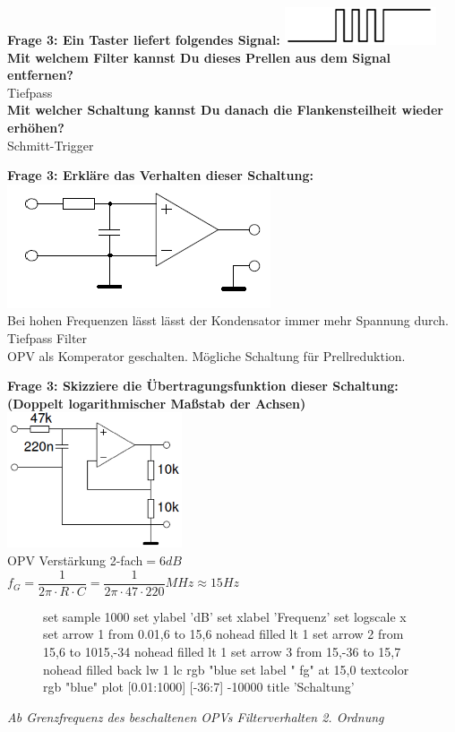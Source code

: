 \documentclass[11pt,a4paper]{scrartcl}
\begin{document}
\textbf{Frage 3: Ein Taster liefert folgendes Signal:} \includegraphics{Taster.png}\\
\textbf{Mit welchem Filter kannst Du dieses Prellen aus dem Signal entfernen?}\\
Tiefpass\\
\textbf{Mit welcher Schaltung kannst Du danach die Flankensteilheit wieder erhöhen?}\\
Schmitt-Trigger

\textbf{Frage 3: Erkläre das Verhalten dieser Schaltung:}\\
\includegraphics{Schaltung_1.png}\\
Bei hohen Frequenzen lässt lässt der Kondensator immer mehr Spannung durch. Tiefpass Filter\\
OPV als Komperator geschalten. Mögliche Schaltung für Prellreduktion.

\textbf{Frage 3: Skizziere die Übertragungsfunktion dieser Schaltung:\\
(Doppelt logarithmischer Maßstab der Achsen)}\\
\includegraphics[height=4cm]{Schaltung_2.png}\\
OPV Verstärkung 2-fach$=6dB$\\
$f_G=\dfrac{1}{2 \pi \cdot R \cdot C}=\dfrac{1}{2\pi\cdot 47 \cdot 220}MHz\approx 15Hz$\\
\begin{figure}[H]
	\centering
	\begin{gnuplot}[terminal=pdf,scale=0.8]
			set sample 1000
			set ylabel 'dB'
			set xlabel 'Frequenz'
			set logscale x
			set arrow 1 from 0.01,6 to 15,6 nohead filled lt 1
			set arrow 2 from 15,6 to 1015,-34 nohead filled lt 1
			set arrow 3 from 15,-36 to 15,7 nohead  filled back lw 1 lc rgb "blue
			set label " fg" at 15,0 textcolor rgb "blue"
			plot [0.01:1000] [-36:7] -10000 title 'Schaltung'
	\end{gnuplot}
\end{figure}
\textit{Ab Grenzfrequenz des beschaltenen OPVs Filterverhalten 2. Ordnung}
\newpage
\end{document}
